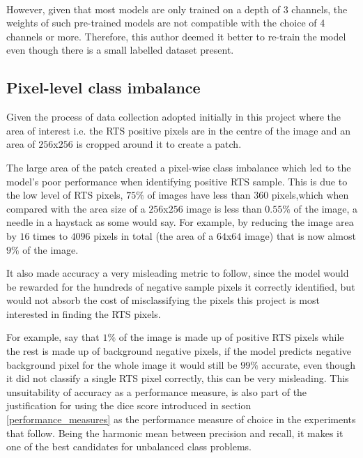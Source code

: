 \paragraph{}
However, given that most models are only trained on a depth of 3 channels, the weights of such pre-trained models are not compatible with the choice of 4 channels or more.
Therefore, this author deemed it better to re-train the model even though there is a small labelled dataset present.

\subsection{Pixel-level class imbalance} \label{class_imbalance}

Given the process of data collection adopted initially in this project where the area of interest i.e. the \gls{RTS} positive pixels are in the centre of the image and an area of $256$x$256$ is cropped around it to create a patch. 

The large area of the patch created a pixel-wise class imbalance which led to the model's poor performance when identifying positive \gls{RTS} sample. This is due to the low level of \gls{RTS} pixels, $75\%$ of images have less than $360$ pixels,which when compared with the area size of a $256$x$256$ image is less than $0.55\%$ of the image, a needle in a haystack as some would say. For example, by reducing the image area by $16$ times to $4096$ pixels in total (the area of a $64$x$64$ image) that is now almost $9\%$ of the image.

It also made accuracy a very misleading metric to follow, since the model would be rewarded for the hundreds of negative sample pixels it correctly identified, but would not absorb the cost of misclassifying the pixels this project is most interested in finding the \gls{RTS} pixels. 

For example, say that $1\%$ of the image is made up of positive \gls{RTS} pixels while the rest is made up of background negative pixels, if the model predicts negative background pixel for the whole image it would still be $99\%$ accurate, even though it did not classify a single \gls{RTS} pixel correctly, this can be very misleading.
This unsuitability of accuracy as a performance measure, is also part of the justification for using the dice score introduced in section \ref{performance_measures} as the performance measure of choice in the experiments that follow. Being the harmonic mean between precision and recall, it makes it one of the best candidates for unbalanced class problems.


